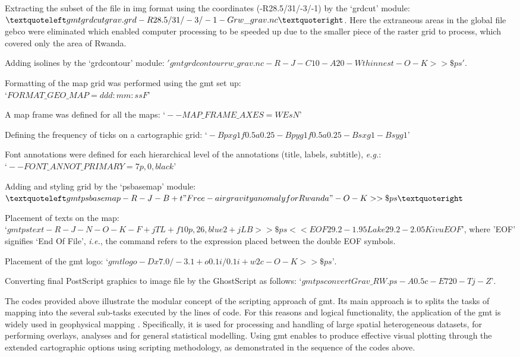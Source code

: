 \documentclass[myclassdoc,debug]{rjparticle}
\begin{document}
Extracting the subset of the file in img format using the coordinates (-R28.5/31/-3/-1) by the ‘grdcut’ module: $‘gmt grdcut grav.grd -R28.5/31/-3/-1 \\-Grw\_grav.nc’$. Here the extraneous areas in the global file \ac{gebco} were eliminated which enabled computer processing to be speeded up due to the smaller piece of the raster grid to process, which covered only the area of Rwanda.

Adding isolines by the ‘grdcontour’ module: $'gmt grdcontour rw\_grav.nc -R -J -C10 -A20 -Wthinnest -O -K >> \$ps'$. 

Formatting of the map grid was performed using the gmt set up: \\$‘FORMAT\_GEO\_MAP=ddd:mm:ssF’$

A map frame was defined for all the maps: $‘--MAP\_FRAME\_AXES=WEsN’$

Defining the frequency of ticks on a cartographic grid: $‘-Bpxg1f0.5a0.25 -Bpyg1f0.5a0.25 -Bsxg1 -Bsyg1’$

Font annotations were defined for each hierarchical level of the annotations (title, labels, subtitle), \emph{e.g.}: $‘--FONT\_ANNOT\_PRIMARY=7p,0,black’$

Adding and styling grid by the ‘psbasemap’ module: $‘gmt psbasemap -R -J -B+t"Free-air gravity anomaly for Rwanda" -O -K >> \$ps’$

Placement of texts on the map: $‘gmt pstext -R -J -N -O -K -F+jTL+f10p,26,blue2+jLB >> \$ps << EOF 29.2 -1.95 Lake 29.2 -2.05 Kivu EOF’$, where 'EOF' signifies ‘End Of File’, \emph{i.e.}, the command refers to the expression placed between the double EOF symbols.

Placement of the \ac{gmt} logo: $‘gmt logo -Dx7.0/-3.1+o0.1i/0.1i+w2c -O -K >> \$ps’$.

Converting final PostScript graphics to image file by the GhostScript as follows: $‘gmt psconvert Grav\_RW.ps -A0.5c -E720 -Tj -Z’$.

The codes provided above illustrate the modular concept of the scripting approach of \ac{gmt}. Its main approach is to splits the tasks of mapping into the several sub-tasks executed by the lines of code. For this reasons and logical functionality, the application of the \ac{gmt} is widely used in geophysical mapping \cite{Barth,Lemenkova2021e,Lemenkova2021f}. Specifically, it is used for processing and handling of large spatial heterogeneous datasets, for performing overlays, analyses and for general statistical modelling. Using \ac{gmt} enables to produce effective visual plotting through the extended cartographic options using scripting methodology, as demonstrated in the sequence of the codes above. 
\end{document}
